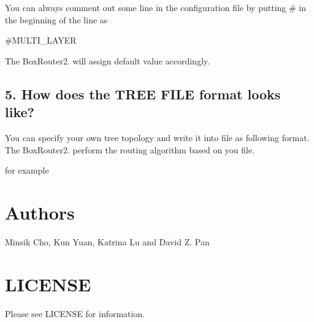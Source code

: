 You can always comment out some line in the configuration file by putting \# in the beginning of the line as \begin{DoxyVerb}#MULTI_LAYER 
\end{DoxyVerb}


The Box\+Router2. will assign default value accordingly.

\subsection*{5. How does the T\+R\+EE F\+I\+LE format looks like?}

You can specify your own tree topology and write it into file as following format. The Box\+Router2. perform the routing algorithm based on you file.


\begin{DoxyCode}{0}
\DoxyCodeLine{!}
\end{DoxyCode}


for example


\begin{DoxyCode}{0}
\DoxyCodeLine{!}
\end{DoxyCode}
 

 \section*{Authors}


\begin{DoxyItemize}
\item Minsik Cho, Kun Yuan, Katrina Lu and David Z. Pan
\end{DoxyItemize}



 \section*{L\+I\+C\+E\+N\+SE}

Please see L\+I\+C\+E\+N\+SE for information.



